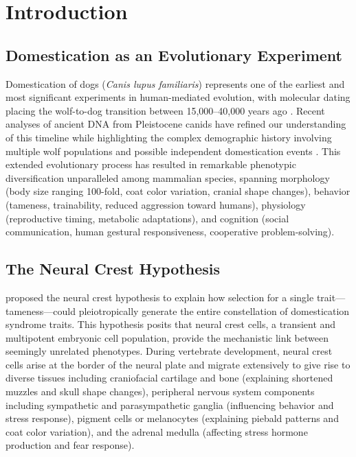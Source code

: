 \documentclass[11pt,letterpaper]{article}
\begin{document}
\newpage

\tableofcontents
\newpage


\section{Introduction}


\subsection{Domestication as an Evolutionary Experiment}

Domestication of dogs (\textit{Canis lupus familiaris}) represents one of the earliest and most significant experiments in human-mediated evolution, with molecular dating placing the wolf-to-dog transition between 15,000--40,000 years ago \citep{Freedman2014, Frantz2016}. Recent analyses of ancient DNA from Pleistocene canids have refined our understanding of this timeline while highlighting the complex demographic history involving multiple wolf populations and possible independent domestication events \citep{Bergstrom2020}. This extended evolutionary process has resulted in remarkable phenotypic diversification unparalleled among mammalian species, spanning morphology (body size ranging 100-fold, coat color variation, cranial shape changes), behavior (tameness, trainability, reduced aggression toward humans), physiology (reproductive timing, metabolic adaptations), and cognition (social communication, human gestural responsiveness, cooperative problem-solving).

\subsection{The Neural Crest Hypothesis}

\citet{Wilkins2014} proposed the neural crest hypothesis to explain how selection for a single trait---tameness---could pleiotropically generate the entire constellation of domestication syndrome traits. This hypothesis posits that neural crest cells, a transient and multipotent embryonic cell population, provide the mechanistic link between seemingly unrelated phenotypes. During vertebrate development, neural crest cells arise at the border of the neural plate and migrate extensively to give rise to diverse tissues including craniofacial cartilage and bone (explaining shortened muzzles and skull shape changes), peripheral nervous system components including sympathetic and parasympathetic ganglia (influencing behavior and stress response), pigment cells or melanocytes (explaining piebald patterns and coat color variation), and the adrenal medulla (affecting stress hormone production and fear response).
\end{document}
